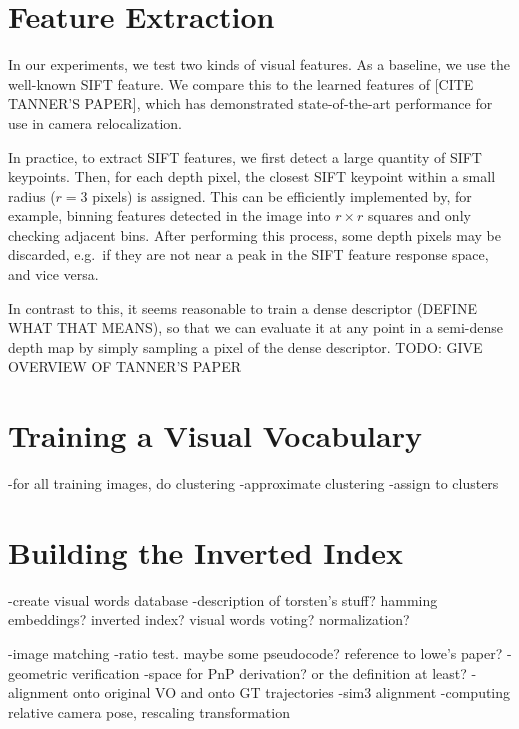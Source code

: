 \section{Feature Extraction}
In our experiments, we test two kinds of visual features. As a baseline, we use the well-known SIFT feature. We compare this to the learned features of [CITE TANNER'S PAPER], which has demonstrated state-of-the-art performance for use in camera relocalization.

In practice, to extract SIFT features, we first detect a large quantity of SIFT keypoints. Then, for each depth pixel, the closest SIFT keypoint within a small radius ($r=3$ pixels) is assigned. This can be efficiently implemented by, for example, binning features detected in the image into $r \times r$ squares and only checking adjacent bins. After performing this process, some depth pixels may be discarded, e.g.\ if they are not near a peak in the SIFT feature response space, and vice versa.

In contrast to this, it seems reasonable to train a dense descriptor (DEFINE WHAT THAT MEANS), so that we can evaluate it at any point in a semi-dense depth map by simply sampling a pixel of the dense descriptor. TODO: GIVE OVERVIEW OF TANNER'S PAPER

\section{Training a Visual Vocabulary}
	
-for all training images, do clustering
	-approximate clustering
	-assign to clusters

\section{Building the Inverted Index}
-create visual words database
	-description of torsten's stuff? hamming embeddings? inverted index? visual words voting? normalization?


-image matching
	-ratio test. maybe some pseudocode? reference to lowe's paper?
-geometric verification
	-space for PnP derivation? or the definition at least?
-alignment onto original VO and onto GT trajectories
	-sim3 alignment
	-computing relative camera pose, rescaling transformation
